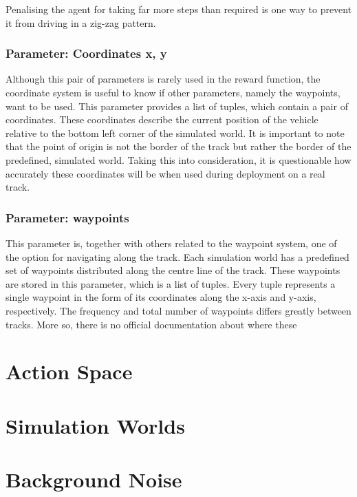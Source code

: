 Penalising the agent for taking far more steps than required is one way to prevent it from driving in a zig-zag pattern.

\subsubsection{Parameter: Coordinates x, y}
Although this pair of parameters is rarely used in the reward function, the coordinate system is useful to know if other parameters, namely the waypoints, want to be used. This parameter provides a list of tuples, which contain a pair of coordinates. These coordinates describe the current position of the vehicle relative to the bottom left corner of the simulated world. It is important to note that the point of origin is not the border of the track but rather the border of the predefined, simulated world. Taking this into consideration, it is questionable how accurately these coordinates will be when used during deployment on a real track.

\subsubsection{Parameter: waypoints}
This parameter is, together with others related to the waypoint system, one of the option for navigating along the track. Each simulation world has a predefined set of waypoints distributed along the centre line of the track. These waypoints are stored in this parameter, which is a list of tuples. Every tuple represents a single waypoint in the form of its coordinates along the x-axis and y-axis, respectively. The frequency and total number of waypoints differs greatly between tracks. More so, there is no official documentation about where these

\section{Action Space}

\section{Simulation Worlds}

\section{Background Noise}\label{sec:BackgroundNoise}